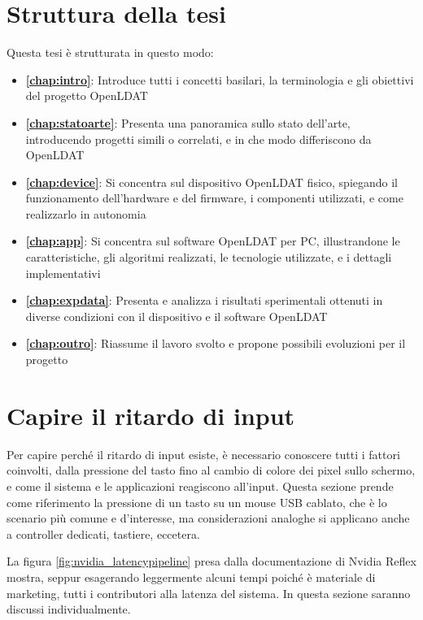 \section{Struttura della tesi}
Questa tesi è strutturata in questo modo:
\begin{itemize}
	\item \textbf{\autoref{chap:intro}}: Introduce tutti i concetti basilari, la terminologia e gli obiettivi del progetto OpenLDAT
	\item \textbf{\autoref{chap:statoarte}}: Presenta una panoramica sullo stato dell'arte, introducendo progetti simili o correlati, e in che modo differiscono da OpenLDAT
	\item \textbf{\autoref{chap:device}}: Si concentra sul dispositivo OpenLDAT fisico, spiegando il funzionamento dell'hardware e del firmware, i componenti utilizzati, e come realizzarlo in autonomia
	\item \textbf{\autoref{chap:app}}: Si concentra sul software OpenLDAT per PC, illustrandone le caratteristiche, gli algoritmi realizzati, le tecnologie utilizzate, e i dettagli implementativi
	\item \textbf{\autoref{chap:expdata}}: Presenta e analizza i risultati sperimentali ottenuti in diverse condizioni con il dispositivo e il software OpenLDAT
	\item \textbf{\autoref{chap:outro}}: Riassume il lavoro svolto e propone possibili evoluzioni per il progetto
\end{itemize} 

\section{Capire il ritardo di input}
Per capire perché il ritardo di input esiste, è necessario conoscere tutti i fattori coinvolti, dalla pressione del tasto fino al cambio di colore dei pixel sullo schermo, e come il sistema e le applicazioni reagiscono all'input. Questa sezione prende come riferimento la pressione di un tasto su un mouse USB cablato, che è lo scenario più comune e d'interesse, ma considerazioni analoghe si applicano anche a controller dedicati, tastiere, eccetera.

La figura \ref{fig:nvidia_latencypipeline} presa dalla documentazione di Nvidia Reflex mostra, seppur esagerando leggermente alcuni tempi poiché è materiale di marketing, tutti i contributori alla latenza del sistema. In questa sezione saranno discussi individualmente.

